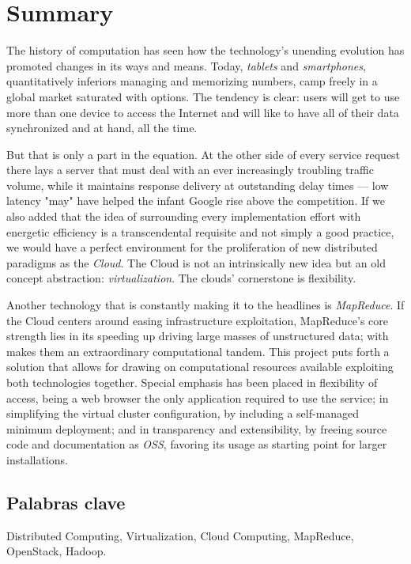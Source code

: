 \chapter*{Summary}

\noindent The history of computation has seen how the technology's unending evolution has promoted changes in its ways and means. Today, \textit{tablets} and \textit{smartphones}, quantitatively inferiors managing and memorizing numbers, camp freely in a global market saturated with options. The tendency is clear: users will get to use more than one device to access the Internet and will like to have all of their data synchronized and at hand, all the time.

But that is only a part in the equation. At the other side of every service request there lays a server that must deal with an ever increasingly troubling traffic volume, while it maintains response delivery at outstanding delay times --- low latency "may" have helped the infant Google rise above the competition. If we also added that the idea of surrounding every implementation effort with energetic efficiency is a transcendental requisite and not simply a good practice, we would have a perfect environment for the proliferation of new distributed paradigms as the \emph{Cloud}. The Cloud is not an intrinsically new idea but an old concept abstraction: \emph{virtualization}. The clouds' cornerstone is flexibility.

Another technology that is constantly making it to the headlines is \emph{MapReduce}. If the Cloud centers around easing infrastructure exploitation, MapReduce's core strength lies in its speeding up driving large masses of unstructured data; with makes them an extraordinary computational tandem. This project puts forth a solution that allows for drawing on computational resources available exploiting both technologies together. Special emphasis has been placed in flexibility of access, being a web browser the only application required to use the service; in simplifying the virtual cluster configuration, by including a self-managed minimum deployment; and in transparency and extensibility, by freeing source code and documentation as \emph{OSS}, favoring its usage as starting point for larger installations.


\section*{Palabras clave}
\noindent Distributed Computing, Virtualization, Cloud Computing, MapReduce, OpenStack, Hadoop.
